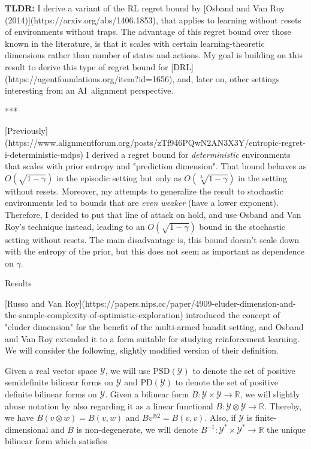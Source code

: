 \documentclass[a4paper]{article}
\newcommand{\Co}[1]{}
\newcommand{\AP}[1]{\left(#1\right)}
\newcommand{\Reals}{\mathbb{R}}
\newcommand{\PD}{\mathrm{PD}}
\newcommand{\PSD}{\mathrm{PSD}}
\newcommand{\B}{B}
\newcommand{\Y}{\mathcal{Y}}
\begin{document}
\textbf{TLDR:}\Co{b} I derive a variant of the RL regret bound by [Osband and Van Roy (2014)](https://arxiv.org/abs/1406.1853), that applies to learning without resets of environments without traps. The advantage of this regret bound over those known in the literature, is that it scales with certain learning-theoretic dimensions rather than number of states and actions. My goal is building on this result to derive this type of regret bound for [DRL](https://agentfoundations.org/item?id=1656), and, later on, other settings interesting from an AI\ alignment perspective.

***

[Previously](https://www.alignmentforum.org/posts/zTf946PQwN2AN3X3Y/entropic-regret-i-deterministic-mdps) I derived a regret bound for \textit{deterministic}\Co{i} environments that scales with prior entropy and "prediction dimension". That bound behaves as $O\AP{\sqrt{1-\gamma}}$ in the episodic setting but only as $O\AP{\sqrt[3]{1-\gamma}}$ in the setting without resets. Moreover, my attempts to generalize the result to stochastic environments led to bounds that are \textit{even weaker}\Co{i} (have a lower exponent). Therefore, I decided to put that line of attack on hold, and use Osband and Van Roy's technique instead, leading to an $O\AP{\sqrt{1-\gamma}}$ bound in the stochastic setting without resets. The main disadvantage is, this bound doesn't scale down with the entropy of the prior, but this does not seem as important as dependence on $\gamma$.

\begin{Huge}Results\end{Huge}

[Russo and Van Roy](https://papers.nips.cc/paper/4909-eluder-dimension-and-the-sample-complexity-of-optimistic-exploration) introduced the concept of "eluder dimension"  for the benefit of the multi-armed bandit setting, and Osband and Van Roy extended it to a form suitable for studying reinforcement learning. We will consider the following, slightly modified version of their definition.

Given a real vector space $\Y$, we will use $\PSD(\Y)$ to denote the set of positive semidefinite bilinear forms on $\Y$ and $\PD(\Y)$ to denote the set of positive definite bilinear forms on $\Y$. Given a bilinear form $\B:\Y\times\Y\rightarrow\Reals$, we will slightly abuse notation by also regarding it as a linear functional $\B:\Y\otimes\Y\rightarrow\Reals$. Thereby, we have $\B(v \otimes w) = \B(v, w)$ and $\B v^{\otimes 2}=\B (v,v)$. Also, if $\Y$ is finite-dimensional and $\B$ is non-degenerate, we will denote $\B ^{-1}:\Y^*\times\Y^*\rightarrow\Reals$ the unique bilinear form which satisfies
\end{document}
